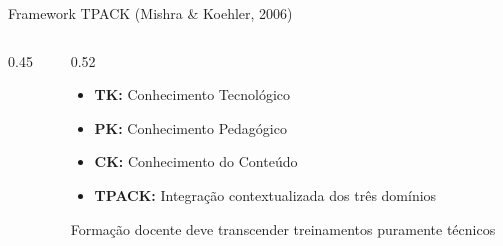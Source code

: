 \documentclass[aspectratio=169,xcolor=table]{beamer}
\begin{document}
\begin{frame}{Framework TPACK (Mishra \& Koehler, 2006)}
    \begin{columns}[T]
        \begin{column}{0.45\textwidth}
            \begin{center}
            \end{center}
        \end{column}
        \begin{column}{0.52\textwidth}
            \begin{itemize}
                \item \textbf{TK:} Conhecimento Tecnológico
                \item \textbf{PK:} Conhecimento Pedagógico
                \item \textbf{CK:} Conhecimento do Conteúdo
                \item \textbf{TPACK:} Integração contextualizada dos três domínios
            \end{itemize}
            \vspace{0.3cm}
            \small
            Formação docente deve transcender treinamentos puramente técnicos
        \end{column}
    \end{columns}
\end{frame}
\end{document}
